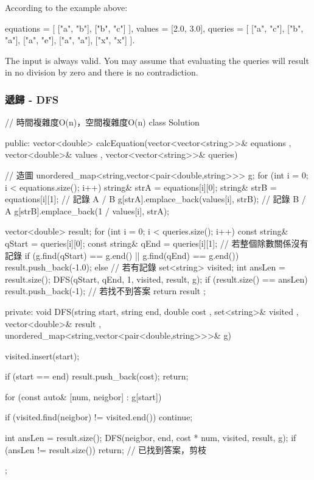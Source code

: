 According to the example above:

\begin{Code}
equations = [ ["a", "b"], ["b", "c"] ],
values = [2.0, 3.0],
queries = [ ["a", "c"], ["b", "a"], ["a", "e"], ["a", "a"], ["x", "x"] ]. 
\end{Code}

The input is always valid. You may assume that evaluating the queries will result in no division by zero and there is no contradiction.

\subsubsection{遞歸 - DFS}
\begin{Code}
// 時間複雜度O(n)，空間複雜度O(n)
class Solution {
public:
    vector<double> calcEquation(vector<vector<string>>& equations
                                , vector<double>& values
                                , vector<vector<string>>& queries){
        // 造圖
        unordered_map<string,vector<pair<double,string>>> g;
        for (int i = 0; i < equations.size(); i++)
        {
            string& strA = equations[i][0];
            string& strB = equations[i][1];
            // 記錄 A / B
            g[strA].emplace_back(values[i], strB);
            // 記錄 B / A
            g[strB].emplace_back(1 / values[i], strA);
        }

        vector<double> result;
        for (int i = 0; i < queries.size(); i++)
        {
            const string& qStart = queries[i][0];
            const string& qEnd = queries[i][1];
            // 若整個除數關係沒有記錄
            if (g.find(qStart) == g.end() || g.find(qEnd) == g.end())
                result.push_back(-1.0);
            else
            {
                // 若有記錄
                set<string> visited;
                int ansLen = result.size();
                DFS(qStart, qEnd, 1, visited, result, g);
                if (result.size() == ansLen)
                    result.push_back(-1); // 若找不到答案
            }
        }
        return result ;
    }
private:
    void DFS(string start, string end, double cost
             , set<string>& visited
             , vector<double>& result
             , unordered_map<string,vector<pair<double,string>>>& g)
    {
        visited.insert(start);

        if (start == end)
        {
            result.push_back(cost);
            return;
        }

        for (const auto& [num, neigbor] : g[start])
        {
            if (visited.find(neigbor) != visited.end()) continue;

            int ansLen = result.size();
            DFS(neigbor, end, cost * num, visited, result, g);
            if (ansLen != result.size()) return; // 已找到答案，剪枝
        }
    }
};
\end{Code}

